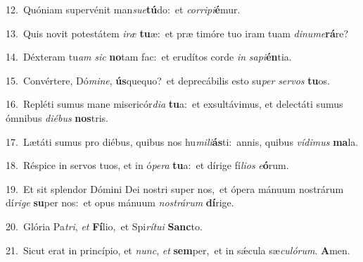 {\numbfont\textcolor{\numbcolor}{12.}}~Quóniam supervénit man\-\textit{su}\-\textit{e}\textbf{tú}do:~\star et \textit{cor}\-\textit{ri}\textit{pi}\textbf{é}mur.\par
{\numbfont\textcolor{\numbcolor}{13.}}~Quis novit potestátem \textit{i}\-\textit{ræ} \textbf{tu}\-æ:~\star et præ timóre tuo iram tuam \textit{di}\-\textit{nu}\textit{me}\textbf{rá}re?\par
{\numbfont\textcolor{\numbcolor}{14.}}~Déxteram tu\textit{am} \textit{sic} \textbf{no}\-tam fac:~\star et erudítos corde \textit{in} \textit{sa}\-\textit{pi}\textbf{én}tia.\par
{\numbfont\textcolor{\numbcolor}{15.}}~Convértere, Dó\-\textit{mi}\-\textit{ne}, \textbf{ús}\-quequo?~\star et deprecábilis esto su\textit{per} \textit{ser}\-\textit{vos} \textbf{tu}\-os.\par
{\numbfont\textcolor{\numbcolor}{16.}}~Repléti sumus mane misericór\-\textit{di}\-\textit{a} \textbf{tu}\-a:~\star et exsultávimus, et delectáti sumus ómnibus \textit{di}\-\textit{é}\textit{bus} \textbf{nos}\-tris.\par
{\numbfont\textcolor{\numbcolor}{17.}}~Lætáti sumus pro diébus, quibus nos hu\-\textit{mi}\-\textit{li}\textbf{ás}ti:~\star annis, quibus \textit{ví}\-\textit{di}\textit{mus} \textbf{ma}\-la.\par
{\numbfont\textcolor{\numbcolor}{18.}}~Réspice in servos tuos, et in ó\-\textit{pe}\-\textit{ra} \textbf{tu}\-a:~\star et dírige fí\-\textit{li}\-\textit{os} \textit{e}\-\textbf{ó}rum.\par
{\numbfont\textcolor{\numbcolor}{19.}}~Et sit splendor Dómini Dei nostri super nos,~\dagger et ópera mánuum nostrárum dí\-\textit{ri}\-\textit{ge} \textbf{su}\-per nos:~\star et opus mánuum \textit{nos}\-\textit{trá}\textit{rum} \textbf{dí}\-rige.\par
{\numbfont\textcolor{\numbcolor}{20.}}~Glória Pa\-\textit{tri}\-, \textit{et} \textbf{Fí}\-lio,~\star et Spi\-\textit{rí}\-\textit{tu}\textit{i} \textbf{Sanc}\-to.\par
{\numbfont\textcolor{\numbcolor}{21.}}~Sicut erat in princípio, et \textit{nunc}\-, \textit{et} \textbf{sem}\-per,~\star et in sǽcula sæ\-\textit{cu}\-\textit{ló}\textit{rum}. \textbf{A}\-men.\par
